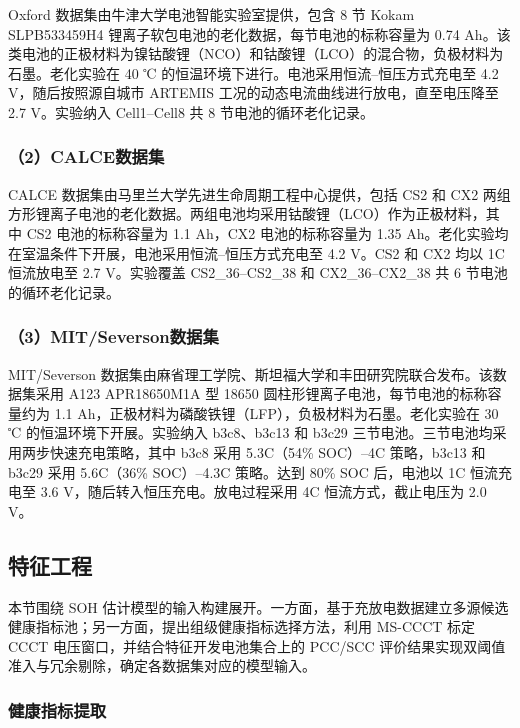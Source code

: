 Oxford 数据集由牛津大学电池智能实验室提供，包含 8 节 Kokam SLPB533459H4 锂离子软包电池的老化数据，每节电池的标称容量为 0.74 Ah\cite{ref28}。该类电池的正极材料为镍钴酸锂（NCO）和钴酸锂（LCO）的混合物，负极材料为石墨\cite{ref60}。老化实验在 40 ℃ 的恒温环境下进行。电池采用恒流–恒压方式充电至 4.2 V，随后按照源自城市 ARTEMIS 工况的动态电流曲线进行放电，直至电压降至 2.7 V\cite{ref28,ref61}。实验纳入 Cell1–Cell8 共 8 节电池的循环老化记录。

\subsubsection*{（2）CALCE数据集}

CALCE 数据集由马里兰大学先进生命周期工程中心提供，包括 CS2 和 CX2 两组方形锂离子电池的老化数据\cite{ref18,ref61}。两组电池均采用钴酸锂（LCO）作为正极材料，其中 CS2 电池的标称容量为 1.1 Ah，CX2 电池的标称容量为 1.35 Ah。老化实验均在室温条件下开展，电池采用恒流–恒压方式充电至 4.2 V。CS2 和 CX2 均以 1C 恒流放电至 2.7 V。实验覆盖 CS2\_36–CS2\_38 和 CX2\_36–CX2\_38 共 6 节电池的循环老化记录。

\subsubsection*{（3）MIT/Severson数据集}

MIT/Severson 数据集由麻省理工学院、斯坦福大学和丰田研究院联合发布\cite{ref62}。该数据集采用 A123 APR18650M1A 型 18650 圆柱形锂离子电池，每节电池的标称容量约为 1.1 Ah，正极材料为磷酸铁锂（LFP），负极材料为石墨。老化实验在 30 ℃ 的恒温环境下开展。实验纳入 b3c8、b3c13 和 b3c29 三节电池。三节电池均采用两步快速充电策略，其中 b3c8 采用 5.3C（54\% SOC）–4C 策略，b3c13 和 b3c29 采用 5.6C（36\% SOC）–4.3C 策略。达到 80\% SOC 后，电池以 1C 恒流充电至 3.6 V，随后转入恒压充电。放电过程采用 4C 恒流方式，截止电压为 2.0 V。




\subsection{特征工程}

本节围绕 SOH 估计模型的输入构建展开。一方面，基于充放电数据建立多源候选健康指标池；另一方面，提出组级健康指标选择方法，利用 MS-CCCT 标定 CCCT 电压窗口，并结合特征开发电池集合上的 PCC/SCC 评价结果实现双阈值准入与冗余剔除，确定各数据集对应的模型输入。

\subsubsection{健康指标提取}

